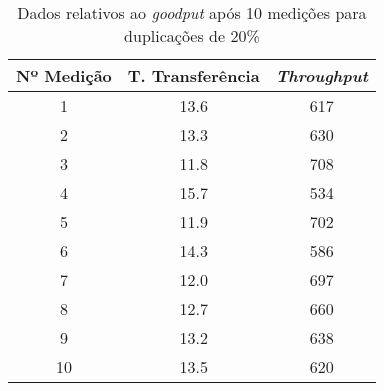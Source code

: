 \begin{table}[!ht]
\centering

\begin{tabular}{c c c}
\toprule
\toprule
	Nº Medição & T. Transferência & \emph{Throughput} \\ 
\midrule
1 & 13.6 & 617\\
2 & 13.3 & 630\\
3 & 11.8 & 708\\
4 & 15.7 & 534\\
5 & 11.9 & 702\\
6 & 14.3 & 586\\
7 & 12.0 & 697\\
8 & 12.7 & 660\\
9 & 13.2 & 638\\
10 & 13.5 & 620\\
\bottomrule
\end{tabular}
\caption{Dados relativos ao \emph{goodput} após 10 medições para duplicações de 20\%}
\label{tab:dup20}
\end{table}
